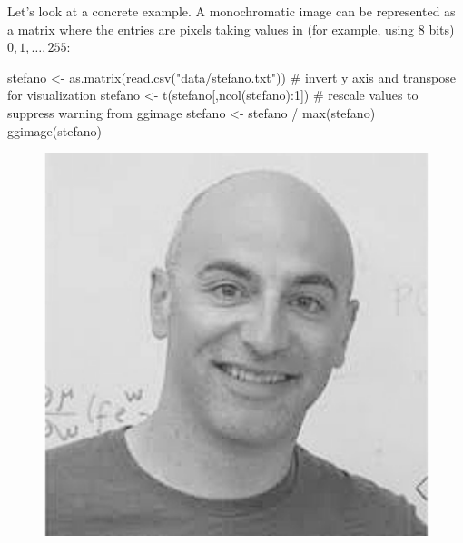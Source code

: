 \documentclass[
  letterpaper,
  DIV=11,
  numbers=noendperiod]{scrreprt}
\newenvironment{Shaded}{\begin{snugshade}}{\end{snugshade}}
\newcommand{\CommentTok}[1]{\textcolor[rgb]{0.37,0.37,0.37}{#1}}
\newcommand{\DecValTok}[1]{\textcolor[rgb]{0.68,0.00,0.00}{#1}}
\newcommand{\FunctionTok}[1]{\textcolor[rgb]{0.28,0.35,0.67}{#1}}
\newcommand{\NormalTok}[1]{\textcolor[rgb]{0.00,0.23,0.31}{#1}}
\newcommand{\OtherTok}[1]{\textcolor[rgb]{0.00,0.23,0.31}{#1}}
\newcommand{\SpecialCharTok}[1]{\textcolor[rgb]{0.37,0.37,0.37}{#1}}
\newcommand{\StringTok}[1]{\textcolor[rgb]{0.13,0.47,0.30}{#1}}
\begin{document}
Let's look at a concrete example. A monochromatic image can be
represented as a matrix where the entries are pixels taking values in
(for example, using 8 bits) \(0, 1, \ldots, 255\):

\begin{Shaded}
\begin{Highlighting}[]
\NormalTok{stefano }\OtherTok{\textless{}{-}} \FunctionTok{as.matrix}\NormalTok{(}\FunctionTok{read.csv}\NormalTok{(}\StringTok{"data/stefano.txt"}\NormalTok{))}
\CommentTok{\# invert y axis and transpose for visualization}
\NormalTok{stefano }\OtherTok{\textless{}{-}} \FunctionTok{t}\NormalTok{(stefano[,}\FunctionTok{ncol}\NormalTok{(stefano)}\SpecialCharTok{:}\DecValTok{1}\NormalTok{])}
\CommentTok{\# rescale values to suppress warning from ggimage}
\NormalTok{stefano }\OtherTok{\textless{}{-}}\NormalTok{ stefano }\SpecialCharTok{/} \FunctionTok{max}\NormalTok{(stefano)}
\FunctionTok{ggimage}\NormalTok{(stefano)}
\end{Highlighting}
\end{Shaded}

\begin{figure}[H]

{\centering \includegraphics{./11-SVD_PCA_files/figure-pdf/unnamed-chunk-4-1.pdf}

}

\end{figure}
\end{document}
